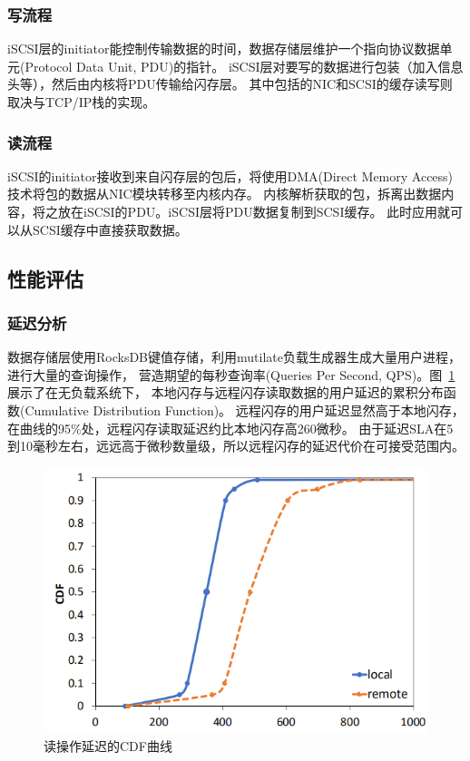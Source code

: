 \subsubsection{写流程}
iSCSI层的initiator能控制传输数据的时间，数据存储层维护一个指向协议数据单元(Protocol Data Unit, PDU)的指针。
iSCSI层对要写的数据进行包装（加入信息头等），然后由内核将PDU传输给闪存层。
其中包括的NIC和SCSI的缓存读写则取决与TCP/IP栈的实现。
\subsubsection{读流程}
iSCSI的initiator接收到来自闪存层的包后，将使用DMA(Direct Memory Access)技术将包的数据从NIC模块转移至内核内存。
内核解析获取的包，拆离出数据内容，将之放在iSCSI的PDU。iSCSI层将PDU数据复制到SCSI缓存。
此时应用就可以从SCSI缓存中直接获取数据。

\subsection{性能评估}
\subsubsection{延迟分析}
数据存储层使用RocksDB键值存储，利用mutilate负载生成器\cite{leverich2014mutilate}生成大量用户进程，进行大量的查询操作，
营造期望的每秒查询率(Queries Per Second, QPS)。图~\ref{fig:read_latency_CDF}展示了在无负载系统下，
本地闪存与远程闪存读取数据的用户延迟的累积分布函数(Cumulative Distribution Function)。
远程闪存的用户延迟显然高于本地闪存，在曲线的95\%处，远程闪存读取延迟约比本地闪存高260微秒。
由于延迟SLA在5到10毫秒左右，远远高于微秒数量级，所以远程闪存的延迟代价在可接受范围内。

\begin{figure}
\centering
\includegraphics[scale=0.8]{Figures/storage/read_latency_CDF.jpg}
\decoRule
\caption{读操作延迟的CDF曲线}
\label{fig:read_latency_CDF}
\end{figure}

